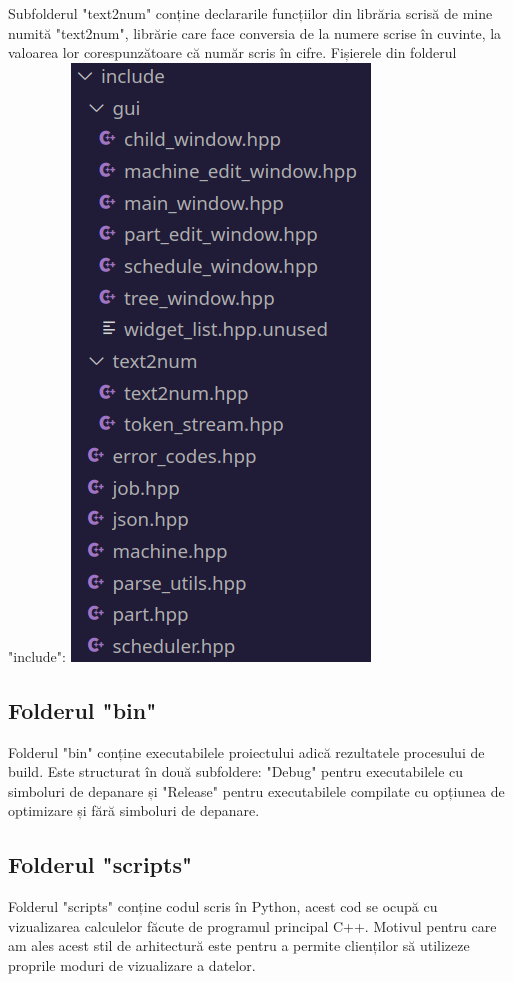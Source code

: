 \documentclass[12pt, twoside]{article}
\begin{document}
Subfolderul "text2num" conține declararile funcțiilor
din librăria scrisă de mine numită "text2num", librărie
care face conversia de la numere scrise în cuvinte, la
valoarea lor corespunzătoare că număr scris în cifre.
\newline
\newline
Fișierele din folderul "include":
\newline
\includegraphics[scale=0.6]{include.png}
\newline

\subsection{Folderul "bin"}
Folderul "bin" conține executabilele proiectului
adică rezultatele procesului de build. Este structurat
în două subfoldere: "Debug" pentru executabilele cu
simboluri de depanare și "Release" pentru executabilele
compilate cu opțiunea de optimizare și fără simboluri
de depanare.

\subsection{Folderul "scripts"}
Folderul "scripts" conține codul scris în Python,
acest cod se ocupă cu vizualizarea calculelor făcute
de programul principal C++. Motivul pentru care am ales
acest stil de arhitectură este pentru a permite clienților
să utilizeze proprile moduri de vizualizare a datelor.
\end{document}
